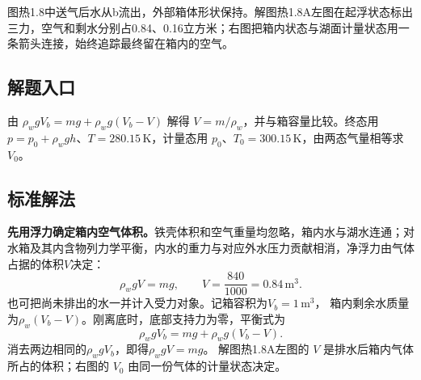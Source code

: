 \documentclass[UTF8,fontset=fandol,a4paper,11pt]{ctexart}
\begin{document}
图热1.8中送气后水从b流出，外部箱体形状保持。解图热1.8A左图在起浮状态标出三力，空气和剩水分别占0.84、0.16立方米；右图把箱内状态与湖面计量状态用一条箭头连接，始终追踪最终留在箱内的空气。



\subsection*{解题入口}

由 $\rho_wgV_b=mg+\rho_wg(V_b-V)$ 解得 $V=m/\rho_w$，并与箱容量比较。终态用 $p=p_0+\rho_wgh$、$T=280.15\,\mathrm K$，计量态用 $p_0$、$T_0=300.15\,\mathrm K$，由两态气量相等求 $V_0$。



\subsection*{标准解法}

\textbf{先用浮力确定箱内空气体积。}铁壳体积和空气重量均忽略，箱内水与湖水连通；对水箱及其内含物列力学平衡，内水的重力与对应外水压力贡献相消，净浮力由气体占据的体积$V$决定：
\[\rho_wgV=mg,\qquad V=\frac{840}{1000}=0.84\,\mathrm{m^3}.\]
也可把尚未排出的水一并计入受力对象。记箱容积为$V_b=1\,\mathrm{m^3}$，
箱内剩余水质量为$\rho_w(V_b-V)$。刚离底时，底部支持力为零，平衡式为
\[
\rho_wgV_b=mg+\rho_wg(V_b-V).
\]
消去两边相同的$\rho_wgV_b$，即得$\rho_wgV=mg$。
解图热1.8A左图的 $V$ 是排水后箱内气体所占的体积；右图的 $V_0$ 由同一份气体的计量状态决定。
\end{document}
